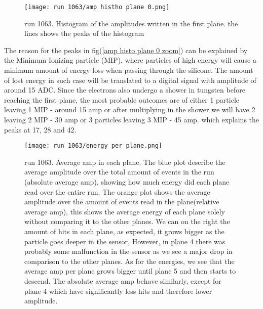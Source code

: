 \documentclass[11pt]{article}
\begin{document}
\begin{figure}[h]
    \centering  \texttt{[image: run 1063/amp histho plane 0.png]}
    \caption{run 1063. Histogram of the amplitudes written in the first plane. the lines shows the peaks of the histogram}
    \label{amp histo plane 0}
\end{figure}



The reason for the peaks in fig(\ref{amp histo plane 0 zoom}) can be explained by the Minimum Ionizing particle (MIP), where particles of high energy will cause a minimum amount of energy loss when passing through the silicone. The amount of lost energy in such case will be translated to a digital signal with amplitude of around 15 ADC. Since the electrons also undergo a shower in tungsten before reaching the first plane, the most probable outcomes are of either 1 particle leaving 1 MIP - around 15 amp or after multiplying in the shower we will have 2 leaving 2 MIP - 30 amp or 3 particles leaving 3 MIP - 45 amp. which explains the peaks at 17, 28 and 42.






\begin{figure}[h]
    \centering  \texttt{[image: run 1063/energy per plane.png]}
    \caption{run 1063. Average amp in each plane. The blue plot describe the average amplitude over the total amount of events in the run (absolute average amp), showing how much energy did each plane read over the entire run. The orange plot shows the average amplitude over the amount of events read in the plane(relative average amp), this shows the average energy of each plane solely without comparing it to the other planes. We can on the right the amount of hits in each plane, as expected, it grows bigger as the particle goes deeper in the sensor, However, in plane 4 there was probably some malfunction in the sensor as we see a major drop in comparison to the other planes. As for the energies, we see that the average amp per plane grows bigger until plane 5 and then starts to descend. The absolute average amp behave similarly, except for plane 4 which have significantly less hits and therefore lower amplitude.}
    \label{avg amp per plane run 1101}
\end{figure}
\end{document}
